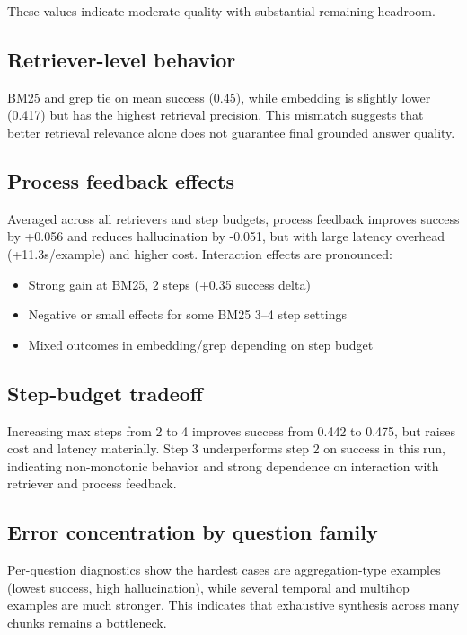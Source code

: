 \documentclass[11pt]{article}
\begin{document}
These values indicate moderate quality with substantial remaining headroom.

\subsection{Retriever-level behavior}
BM25 and grep tie on mean success (0.45), while embedding is slightly lower (0.417) but has the highest retrieval precision. This mismatch suggests that better retrieval relevance alone does not guarantee final grounded answer quality.

\subsection{Process feedback effects}
Averaged across all retrievers and step budgets, process feedback improves success by +0.056 and reduces hallucination by -0.051, but with large latency overhead (+11.3s/example) and higher cost. Interaction effects are pronounced:
\begin{itemize}[leftmargin=*, topsep=2pt, itemsep=1pt]
    \item Strong gain at BM25, 2 steps (+0.35 success delta)
    \item Negative or small effects for some BM25 3--4 step settings
    \item Mixed outcomes in embedding/grep depending on step budget
\end{itemize}

\subsection{Step-budget tradeoff}
Increasing max steps from 2 to 4 improves success from 0.442 to 0.475, but raises cost and latency materially. Step 3 underperforms step 2 on success in this run, indicating non-monotonic behavior and strong dependence on interaction with retriever and process feedback.

\subsection{Error concentration by question family}
Per-question diagnostics show the hardest cases are aggregation-type examples (lowest success, high hallucination), while several temporal and multihop examples are much stronger. This indicates that exhaustive synthesis across many chunks remains a bottleneck.
\end{document}

